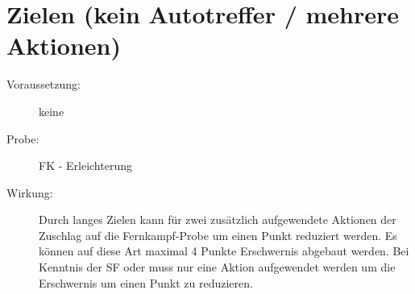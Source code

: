 \section{Zielen (kein Autotreffer / mehrere Aktionen)}
\label{fernkampf.zielen}
\begin{description}
    \item[Voraussetzung:]
        keine
    \item[Probe:]
        FK - Erleichterung
    \item[Wirkung:]
        Durch langes Zielen kann für zwei zusätzlich aufgewendete Aktionen der Zuschlag auf die Fernkampf-Probe um einen Punkt reduziert werden.
        Es können auf diese Art maximal 4 Punkte Erschwernis abgebaut werden.
        Bei Kenntnis der SF  oder  muss nur eine Aktion aufgewendet werden um die Erschwernis um einen Punkt zu reduzieren.
\end{description}
